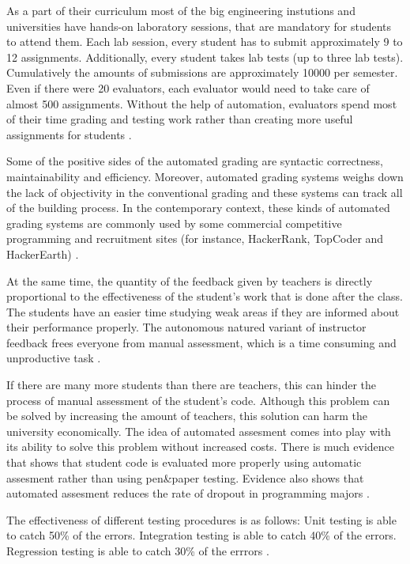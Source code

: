 \documentclass[a4paper, 12pt]{article}
\begin{document}
    As a part of their curriculum most of the big engineering instutions and universities have hands-on laboratory sessions, that are mandatory
    for students to attend them. Each lab session, every student has to submit approximately 9 to 12 assignments. Additionally, every student takes lab tests (up to three lab tests).
    Cumulatively the amounts of submissions are approximately 10000 per semester. Even if there were 20 evaluators, each evaluator would need to take care of almost 500 assignments.
    Without the help of automation, evaluators spend most of their time grading and testing work rather than creating more useful assignments for students \cite{Mandal2007}.

    Some of the positive sides of the automated grading are syntactic correctness, maintainability and efficiency.
    Moreover, automated grading systems weighs down the lack of objectivity in the conventional grading and these systems
    can track all of the building process. In the contemporary context, these kinds of automated grading systems are commonly used by
    some commercial competitive programming and recruitment sites (for instance, HackerRank, TopCoder and HackerEarth) \cite{RestrepoCalle2018}.

    At the same time, the quantity of the feedback given by teachers is directly proportional to the effectiveness of the student's work that is done
    after the class. The students have an easier time studying weak areas if they are informed about their
    performance properly. The autonomous natured variant of instructor feedback frees everyone from manual assessment,
    which is a time consuming and unproductive task \cite{RestrepoCalle2018-2}.
    
    If there are many more students than there are teachers, this can hinder the process of manual assessment of the student's code.
    Although this problem can be solved by increasing the amount of teachers, this solution can harm the university economically.
    The idea of automated assesment comes into play with its ability to solve this problem without increased costs.
    There is much evidence that shows that student code is evaluated more properly using automatic assesment rather than using pen\&paper testing.
    Evidence also shows that automated assesment reduces the rate of dropout in programming majors \cite{Gordillo2019}.

    The effectiveness of different testing procedures is as follows:
    Unit testing is able to catch 50\% of the errors.
    Integration testing is able to catch 40\% of the errors.
    Regression testing is able to catch 30\% of the errrors \cite{Fenton2018}.
\end{document}
